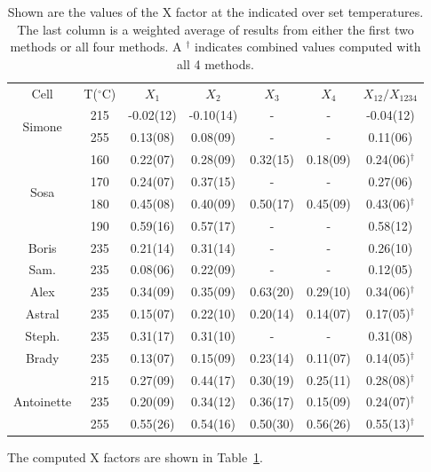 \begin{table}
	\scriptsize
	\captionsetup{font=small}
	\begin{center}
		\def\arraystretch{0.75}
		\setlength\tabcolsep{1pt}
		\begin{tabular}{|c|c|cccc|c|}
			\hline
			Cell & T($^\circ$C) & $X_1$ & $X_2$ & $X_3$ & $X_4$ & $X_{12}/X_{1234}$\\ 
			\multirow{2}{*}{Simone} & 215 & -0.02(12) & -0.10(14) & - & - & -0.04(12) \\
			& 255 & 0.13(08) & 0.08(09) & - & - & 0.11(06) \\
			\hline
			\multirow{4}{*}{Sosa} & 160 & 0.22(07) & 0.28(09) & 0.32(15) & 0.18(09) & 0.24(06)$^\dagger$ \\
			& 170 & 0.24(07) & 0.37(15) & - & - & 0.27(06)\\
			& 180 & 0.45(08) & 0.40(09) & 0.50(17) & 0.45(09) & 0.43(06)$^\dagger$ \\
			& 190 & 0.59(16) & 0.57(17) & - & - & 0.58(12) \\
			\hline
			\hline
			Boris & 235 & 0.21(14) & 0.31(14) & - & - & 0.26(10)\\
			\hline
			Sam. & 235 & 0.08(06) & 0.22(09) & - & - & 0.12(05) \\
			\hline
			Alex & 235 & 0.34(09) & 0.35(09) & 0.63(20) & 0.29(10) & 0.34(06)$^\dagger$\\
			\hline
			Astral & 235 & 0.15(07) & 0.22(10) & 0.20(14) & 0.14(07) & 0.17(05)$^\dagger$\\
			\hline
			Steph. & 235 & 0.31(17) & 0.31(10) & - & - & 0.31(08)\\
			\hline
			Brady & 235 & 0.13(07) & 0.15(09) & 0.23(14) & 0.11(07) & 0.14(05)$^\dagger$\\
			\hline
			\multirow{3}{*}{Antoinette} & 215 & 0.27(09) & 0.44(17) & 0.30(19) & 0.25(11) & 0.28(08)$^\dagger$\\
			& 235 & 0.20(09) & 0.34(12) & 0.36(17) & 0.15(09) & 0.24(07)$^\dagger$\\
			& 255 & 0.55(26) & 0.54(16) & 0.50(30) & 0.56(26) & 0.55(13)$^\dagger$\\
			\hline
		\end{tabular}
		\caption
		{Shown are the values of the X factor at the indicated over set temperatures. The last column is a weighted average of results from either the first two methods or all four methods. A $^\dagger$ indicates combined values computed with all 4 methods.}
		\label{Xtable}
	\end{center}
\end{table}

The computed X factors are shown in Table~\ref{Xtable}. 
















